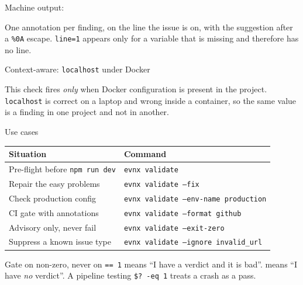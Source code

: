 \begin{frame}[fragile]{Machine output: }

  {\footnotesize One annotation per finding, on the line the issue is on, with
  the suggestion after a \texttt{\%0A} escape. \texttt{line=1} appears only for
  a variable that is missing and therefore has no line.}
\end{frame}

\begin{frame}[fragile]{Context-aware: \texttt{localhost} under Docker}

  {\footnotesize This check fires \emph{only} when Docker configuration is
  present in the project. \texttt{localhost} is correct on a laptop and wrong
  inside a container, so the same value is a finding in one project and not in
  another.}
\end{frame}

\begin{frame}{Use cases}
  \begin{tabular}{@{}p{}p{}@{}}
    \toprule
    \textbf{Situation} & \textbf{Command} \\
    \midrule
    Pre-flight before \texttt{npm run dev} & \texttt{evnx validate} \\
    Repair the easy problems & \texttt{evnx validate --fix} \\
    Check production config & \texttt{evnx validate --env-name production} \\
    CI gate with annotations & \texttt{evnx validate --format github} \\
    Advisory only, never fail & \texttt{evnx validate --exit-zero} \\
    Suppress a known issue type & \texttt{evnx validate --ignore invalid\_url} \\
    \bottomrule
  \end{tabular}

  \vspace{0.8em}
  \begin{block}{Gate on non-zero, never on \texttt{== 1}}
    \exitone{} means ``I have a verdict and it is bad''. \exittwo{} means
    ``I have \emph{no} verdict''. A pipeline testing \texttt{\$? -eq 1} treats a
    crash as a pass.
  \end{block}
\end{frame}
